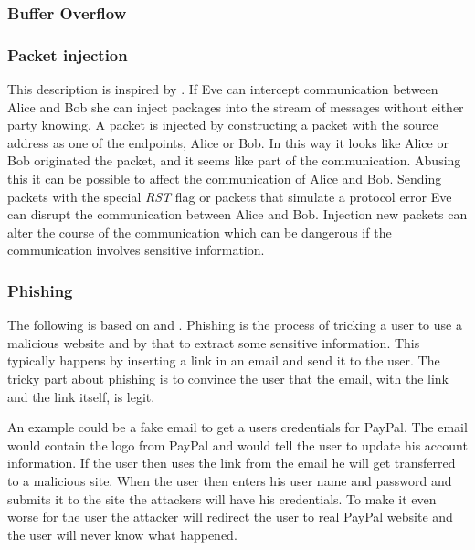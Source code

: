 
\subsubsection{Buffer Overflow}


\subsubsection{Packet injection}
This description is inspired by \cite{packetinjection}.
If Eve can intercept communication between Alice and Bob she can inject packages into the stream of messages without either party knowing.
A packet is injected by constructing a packet with the source address as one of the endpoints, Alice or Bob.
In this way it looks like Alice or Bob originated the packet, and it seems like part of the communication.
Abusing this it can be possible to affect the communication of Alice and Bob.
Sending packets with the special \emph{RST} flag or packets that simulate a protocol error Eve can disrupt the communication between Alice and Bob.
Injection new packets can alter the course of the communication which can be dangerous if the communication involves sensitive information.

\subsubsection{Phishing}
The following is based on \citet{security_engineering_ross_anderson} and \citet{dhamija2006phishing}.
Phishing is the process of tricking a user to use a malicious website and by that to extract some sensitive information.
This typically happens by inserting a link in an email and send it to the user.
The tricky part about phishing is to convince the user that the email, with the link and the link itself, is legit.

An example could be a fake email to get a users credentials for PayPal.
The email would contain the logo from PayPal and would tell the user to update his account information.
If the user then uses the link from the email he will get transferred to a malicious site.
When the user then enters his user name and password and submits it to the site the attackers will have his credentials.
To make it even worse for the user the attacker will redirect the user to real PayPal website and the user will never know what happened.
